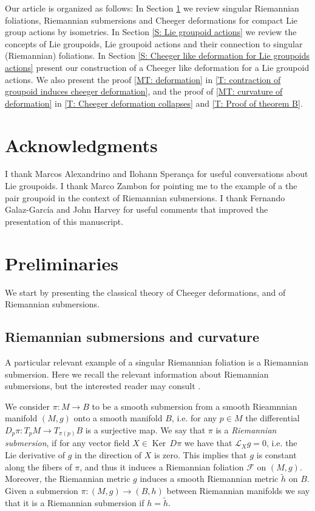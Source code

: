 \documentclass[12pt,a4paper,reqno]{amsart}
\DeclareMathOperator{\kernel}{Ker}
\newcommand{\1}{\mathbbm{1}} %
\newcommand{\fol}{\mathcal{F}} %
\theoremstyle{definition}
\theoremstyle{TheoremNum}
\begin{document}
Our article is organized as follows: In Section \ref{S: preliminaries} we review singular Riemannian foliations, Riemannian submersions and Cheeger deformations for compact Lie group actions by isometries. In Section \ref{S: Lie groupoid actions} we review the concepts of Lie groupoids, Lie groupoid actions and their connection to singular (Riemannian) foliations. In Section \ref{S: Cheeger like deformation for Lie groupoids actions} present our construction of a Cheeger like deformation for a Lie groupoid actions. We also present the proof  \th\ref{MT: deformation} in \th\ref{T: contraction of groupoid induces cheeger deformation}, and the proof of \th\ref{MT: curvature of deformation} in \th\ref{T: Cheeger deformation collapses} and \th\ref{T: Proof of theorem B}.


\section*{Acknowledgments}
I thank Marcos Alexandrino and Ilohann Sperança for useful conversations about Lie grou\-poids. I thank Marco Zambon for pointing me to the example of a the pair groupoid in the context of Riemannian submersions. I thank Fernando Galaz-García and John Harvey for useful comments that improved the presentation of this manuscript.



\section{Preliminaries}\label{S: preliminaries}

We start by presenting the classical theory of Cheeger deformations, and of Riemannian submersions.

\subsection{Riemannian submersions and curvature} A particular relevant example of a singular Riemannian foliation is a Riemannian submersion. Here we recall the relevant information about Riemannian submersions, but the interested reader may consult \cite{GromollWalschap}.

We consider $\pi\colon M\to B$ to be a smooth submersion from a smooth Rieamnnian manifold $(M,g)$ onto a smooth manifold $B$, i.e. for any $p\in M$ the differential $D_p\pi\colon T_pM\to T_{\pi(p)}B$ is a surjective map. We say that $\pi$ is a \emph{Riemannian submersion}, if for any vector field $X\in \kernel\, D\pi$ we have that $\mathcal{L}_X g=0$, i.e. the Lie derivative of $g$ in the direction of $X$ is zero. This implies that $g$ is constant along the fibers of $\pi$, and thus it induces a Riemannian foliation $\fol$ on $(M,g)$. Moreover, the Riemannian metric $g$ induces a smooth Riemannian metric $\tilde{h}$ on $B$. Given a submersion $\pi\colon (M,g)\to (B,h)$ between Riemannian manifolds we say that it is a Riemannian submersion if $h = \tilde{h}$. 
\end{document}
